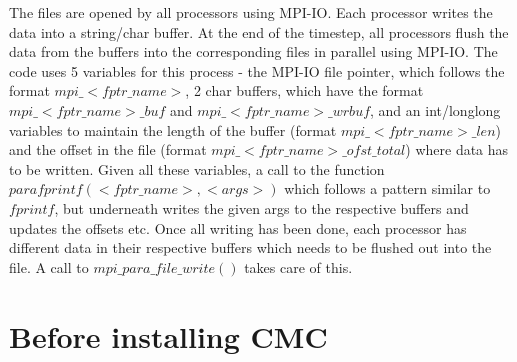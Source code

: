 \documentclass[11pt]{article}
\begin{document}
The files are opened by all processors using MPI-IO. Each processor writes the data into a string/char buffer. At the end of the timestep, all processors flush the data from the buffers into the corresponding files in parallel using MPI-IO. The code uses 5 variables for this process - the MPI-IO file pointer, which follows the format $mpi\_<fptr\_name>$, 2 char buffers, which have the format $mpi\_<fptr\_name>\_buf$ and $mpi\_<fptr\_name>\_wrbuf$, and an int/longlong variables to maintain the length of the buffer (format $mpi\_<fptr\_name>\_len$) and the offset in the file (format $mpi\_<fptr\_name>\_ofst\_total$) where data has to be written. Given all these variables, a call to the function $parafprintf(<fptr\_name>, <args>)$ which follows a pattern similar to $fprintf$, but underneath writes the given args to the respective buffers and updates the offsets etc. Once all writing has been done, each processor has different data in their respective buffers which needs to be flushed out into the file. A call to $mpi\_para\_file\_write()$ takes care of this.


\section{Before installing CMC}
\end{document}
